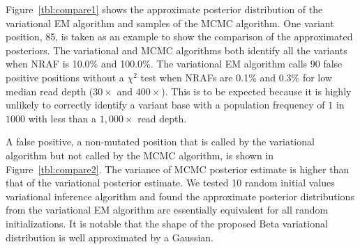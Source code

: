 \documentclass[11pt,reqno]{amsart}
\begin{document}
Figure~\ref{tbl:compare1} shows the approximate posterior distribution of the variational EM algorithm and samples of the MCMC algorithm.
One variant position, 85, is taken as an example to show the comparison of the approximated posteriors.
The variational and MCMC algorithms both identify all the variants when NRAF is 10.0\% and 100.0\%.
The variational EM algorithm calls 90 false positive positions without a $\chi^2$ test when NRAFs are 0.1\% and 0.3\% for low median read depth ($30\times$ and $400\times$).
This is to be expected because it is highly unlikely to correctly identify a variant base with a population frequency of $1$ in $1000$ with less than a $1,000\times$ read depth.

A false positive, a non-mutated position that is called by the variational algorithm but not called by the MCMC algorithm, is shown in Figure~\ref{tbl:compare2}.
The variance of MCMC posterior estimate is higher than that of the variational posterior estimate.
We tested 10 random initial values variational inference algorithm and found the approximate posterior distributions from the variational EM algorithm are essentially equivalent for all random initializations.
It is notable that the shape of the proposed Beta variational distribution is well approximated by a Gaussian.
\end{document}
